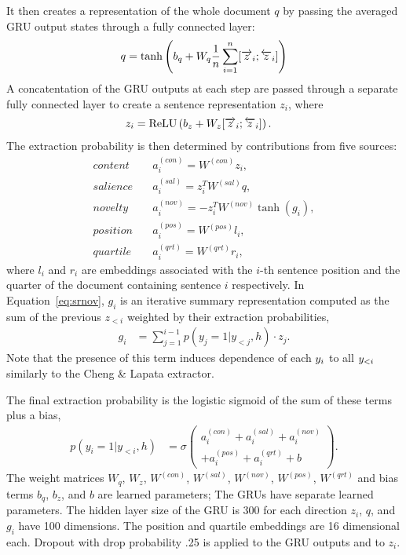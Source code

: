 It then creates a representation
of the whole document $q$ by passing the averaged GRU output states through
a fully connected layer: 
\begin{align}
q = \tanh\left(b_q + W_q\frac{1}{n}\sum_{i=1}^{n} [\overrightarrow{z}_i; \overleftarrow{z}_i] \right)
\end{align}
A concatentation of the GRU outputs at each step
are passed through a separate fully connected layer to create a 
sentence representation $z_i$, where
\begin{align}
    z_i &= \operatorname{ReLU}\left(b_z + W_z [\overrightarrow{z}_i; \overleftarrow{z}_i]\right).
\end{align}
The extraction probability is then determined by contributions from five 
sources:
\begin{align}
    \textit{content} &\quad a^{(con)}_i=W^{(con)} z_i, \\
    \textit{salience}&\quad a^{(sal)}_i = z_i^TW^{(sal)} q, \\
    \textit{novelty}&\quad a^{(nov)}_i = -z_i^TW^{(nov)} \tanh(g_i), \label{eq:srnov} \\
    \textit{position}&\quad a^{(pos)}_i = W^{(pos)} l_i, \\
    \textit{quartile}&\quad a^{(qrt)}_i = W^{(qrt)} r_i,
\end{align}
where $l_i$ and $r_i$ are embeddings associated with the $i$-th sentence
position and the quarter of the document containing sentence $i$ respectively.
In Equation~\ref{eq:srnov}, $g_i$ is an iterative summary representation 
computed as the
sum of the previous $z_{<i}$ weighted by their extraction probabilities,
\begin{align}
g_i & = \sum_{j=1}^{i-1} p(y_j=1|y_{<j},h) \cdot z_j.
\end{align}
Note that the presence of this term induces dependence of each 
$\slabel_i$ to 
all $\slabel_{<i}$ similarly to the Cheng \& Lapata extractor.

The final extraction probability is the logistic sigmoid of the
sum of these terms plus a bias,
\begin{align}
    p(y_i=1|y_{<i}, h) &= \sigma\left(\begin{array}{l}
      a_i^{(con)} + a_i^{(sal)} + a_i^{(nov)} \\
  + a_i^{(pos)}  + a_i^{(qrt)} + b \end{array}\right).
\end{align}
The weight matrices $W_q$, $W_z$, $W^{(con)}$, $W^{(sal)}$, $W^{(nov)}$, $W^{(pos)}$,
$W^{(qrt)}$ and bias terms $b_q$, $b_z$, and $b$ are learned parameters;
The GRUs have separate learned parameters.
The hidden layer size of the GRU is 300 for each direction $z_i$, $q$, and $g_i$ have 100 dimensions. The position and quartile embeddings are 16 dimensional each.
Dropout with drop probability .25 is applied to the GRU outputs and to $z_i$.




